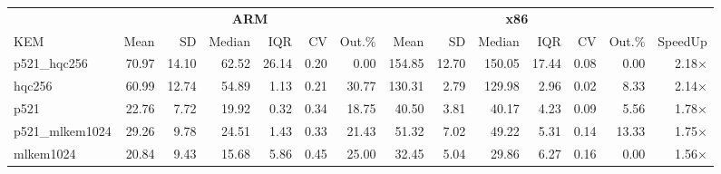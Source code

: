 \begin{table}[!ht]
\centering
\begin{tabular}{l|rrrrrr|rrrrrr|r}
\toprule
& \multicolumn{6}{c}{\bfseries ARM} & \multicolumn{6}{c}{\bfseries x86} & \\
\cmidrule(lr){2-7} \cmidrule(lr){8-13}
KEM & Mean & SD & Median & IQR & CV & Out.\% & Mean & SD & Median & IQR & CV & Out.\% & SpeedUp \\
\midrule
p521_hqc256 & 70.97 & 14.10 & 62.52 & 26.14 & 0.20 & 0.00 & 154.85 & 12.70 & 150.05 & 17.44 & 0.08 & 0.00 & 2.18× \\
hqc256 & 60.99 & 12.74 & 54.89 & 1.13 & 0.21 & 30.77 & 130.31 & 2.79 & 129.98 & 2.96 & 0.02 & 8.33 & 2.14× \\
p521 & 22.76 & 7.72 & 19.92 & 0.32 & 0.34 & 18.75 & 40.50 & 3.81 & 40.17 & 4.23 & 0.09 & 5.56 & 1.78× \\
p521_mlkem1024 & 29.26 & 9.78 & 24.51 & 1.43 & 0.33 & 21.43 & 51.32 & 7.02 & 49.22 & 5.31 & 0.14 & 13.33 & 1.75× \\
mlkem1024 & 20.84 & 9.43 & 15.68 & 5.86 & 0.45 & 25.00 & 32.45 & 5.04 & 29.86 & 6.27 & 0.16 & 0.00 & 1.56× \\
\bottomrule
\end{tabular}
\end{table}

